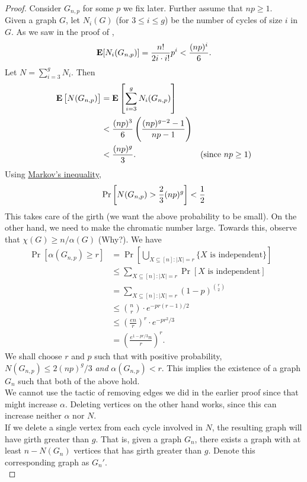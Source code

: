 \documentclass{article}
\begin{document}
			\begin{proof}
				Consider $G_{n,p}$ for some $p$ we fix later. Further assume that $np \ge 1$.\\%
				Given a graph $G$, let $N_i(G)$ (for $3 \le i \le g$) be the number of cycles of size $i$ in $G$. As we saw in the proof of ,
				\[ \textbf{E}[N_i(G_{n,p})] = \frac{n!}{2i \cdot i!} p^i < \frac{(np)^i}{6}. \]
				Let $N = \sum_{i=3}^g N_i$. Then
				\begin{align*}
					\textbf{E}\left[N(G_{n,p})\right] &= \textbf{E}\left[\sum_{i=3}^g N_i(G_{n,p})\right] \\
					&< \frac{(np)^3}{6} \left(\frac{(np)^{g-2} - 1}{np - 1}\right) \\
					&< \frac{(np)^g}{3}. & \text{(since $np\ge 1$)}
				\end{align*}
				Using \href{https://en.wikipedia.org/wiki/Markov%27s_inequality}{Markov's inequality},
				\begin{equation}
					\label{eqn: 2.5}
					\Pr\left[ N(G_{n,p}) > \frac{2}{3} (np)^g \right] < \frac{1}{2} \\
				\end{equation}
				This takes care of the girth (we want the above probability to be small).
				On the other hand, we need to make the chromatic number large. Towards this, observe that $\chi(G) \ge n/\alpha(G)$ (Why?). %
				We have
				\begin{align*}
					\Pr\left[\alpha(G_{n,p}) \ge r\right] &= \Pr\left[ \bigcup_{X\subseteq [n]: |X|=r} \{X\text{ is independent}\} \right] \\
					&\le \sum_{X \subseteq [n] : |X|=r} \Pr[X\text{ is independent}] & \\%
					&= \sum_{X \subseteq [n] : |X|=r} (1-p)^{\binom{r}{2}} \\
					&\le \binom{n}{r} \cdot e^{-pr(r-1)/2} \\
					&\le \left(\frac{en}{r}\right)^r \cdot e^{-pr^2/3} \\
					&= \left(\frac{e^{1-pr/3}n}{r}\right)^r.
				\end{align*}
				We shall choose $r$ and $p$ such that with positive probability, $N(G_{n,p}) \le 2(np)^g/3$ \emph{and} $\alpha(G_{n,p}) < r$. This implies the existence of a graph $G_n$ such that both of the above hold.\\
				We cannot use the tactic of removing edges we did in the earlier proof since that might increase $\alpha$. Deleting vertices on the other hand works, since this can increase neither $\alpha$ nor $N$.\\
				If we delete a single vertex from each cycle involved in $N$, the resulting graph will have girth greater than $g$. That is, given a graph $G_n$, there exists a graph with at least $n - N(G_n)$ vertices that has girth greater than $g$. Denote this corresponding graph as $G_n'$.\\


\end{proof}
\end{document}
